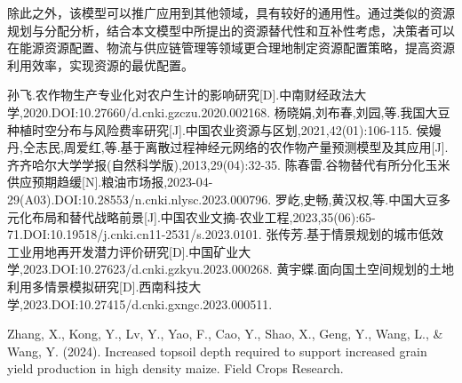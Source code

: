 \documentclass[withoutpreface]{cumcmthesis}
\begin{document}
除此之外，该模型可以推广应用到其他领域，具有较好的通用性。通过类似的资源规划与分配分析，结合本文模型中所提出的资源替代性和互补性考虑，决策者可以在能源资源配置、物流与供应链管理等领域更合理地制定资源配置策略，提高资源利用效率，实现资源的最优配置。

\begin{thebibliography}{99}  
 孙飞.农作物生产专业化对农户生计的影响研究[D].中南财经政法大学,2020.DOI:10.27660/d.cnki.gzczu.2020.002168.
 杨晓娟,刘布春,刘园,等.我国大豆种植时空分布与风险费率研究[J].中国农业资源与区划,2021,42(01):106-115.
 侯嫚丹,仝志民,周爱红,等.基于离散过程神经元网络的农作物产量预测模型及其应用[J].齐齐哈尔大学学报(自然科学版),2013,29(04):32-35.
 陈春雷.谷物替代有所分化玉米供应预期趋缓[N].粮油市场报,2023-04-29(A03).DOI:10.28553/n.cnki.nlysc.2023.000796.
 罗屹,史畅,黄汉权,等.中国大豆多元化布局和替代战略前景[J].中国农业文摘-农业工程,2023,35(06):65-71.DOI:10.19518/j.cnki.cn11-2531/s.2023.0101.
 张传芳.基于情景规划的城市低效工业用地再开发潜力评价研究[D].中国矿业大学,2023.DOI:10.27623/d.cnki.gzkyu.2023.000268.
 黄宇蝶.面向国土空间规划的土地利用多情景模拟研究[D].西南科技大学,2023.DOI:10.27415/d.cnki.gxngc.2023.000511.

 Zhang, X., Kong, Y., Lv, Y., Yao, F., Cao, Y., Shao, X., Geng, Y., Wang, L., \& Wang, Y. (2024). Increased topsoil depth required to support increased grain yield production in high density maize. Field Crops Research.



\end{thebibliography}
\end{document}
